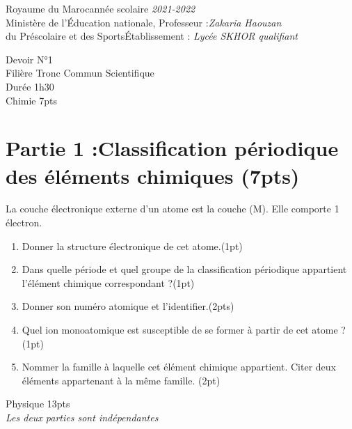 \documentclass[12pt]{article}
\newcommand\headerMe[2]{\noindent{}#1\hfill#2}
\begin{document}
\headerMe{Royaume du Maroc}{année scolaire \emph{2021-2022}}\\
\headerMe{Ministère de l'Éducation nationale, }{  Professeur :\emph{Zakaria Haouzan}}\\
\headerMe{du Préscolaire et des Sports}{Établissement : \emph{Lycée SKHOR qualifiant}}\\

\begin{center}
Devoir  N°1 \\
   Filière Tronc Commun Scientifique\\
Durée 1h30
\\
    \vspace{.2cm}
\hrulefill
\Large{Chimie 7pts}
\hrulefill\\

\end{center}
 \section*{Partie 1 :Classification périodique des éléments chimiques \dotfill (7pts) }
La couche électronique externe d'un atome est la couche (M). Elle comporte 1 électron. 
\begin{enumerate}
    \item Donner la structure électronique de cet atome.\dotfill(1pt)

    \item Dans quelle période et quel groupe de la classification périodique appartient l'élément chimique correspondant ?\dotfill(1pt)
    \item Donner son numéro atomique et l'identifier.\dotfill(2pts)
    \item Quel ion monoatomique est susceptible de se former à partir de cet atome ? \dotfill(1pt)
 \item Nommer la famille à laquelle cet élément chimique appartient. Citer deux éléments appartenant à la
     même famille.  \dotfill(2pt)
\end{enumerate}

\begin{center}
    \vspace{2cm}
\hrulefill
\Large{Physique 13pts}
\hrulefill\\
    \emph{Les deux parties sont indépendantes}
\end{center}
\end{document}
